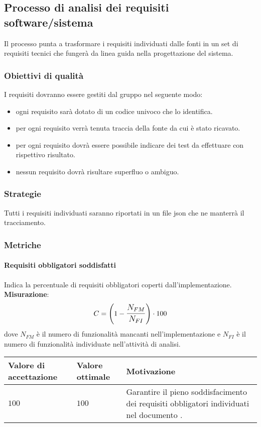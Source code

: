 \subsection{Processo di analisi dei requisiti software/sistema}

Il processo punta a trasformare i requisiti individuati dalle fonti in un set di requisiti tecnici che fungerà da linea guida nella progettazione del sistema.

\subsubsection{Obiettivi di qualità}
I requisiti dovranno essere gestiti dal gruppo nel seguente modo:

\begin{itemize}
\item ogni requisito sarà dotato di un codice univoco che lo identifica.
\item per ogni requisito verrà tenuta traccia della fonte da cui è stato ricavato.
\item per ogni requisito dovrà essere possibile indicare dei test da effettuare con rispettivo risultato.
\item nessun requisito dovrà risultare superfluo o ambiguo.
\end{itemize}

\subsubsection{Strategie}
Tutti i requisiti individuati saranno riportati in un file json che ne manterrà il tracciamento.

\subsubsection{Metriche}
\paragraph{Requisiti obbligatori soddisfatti}
Indica la percentuale di requisiti obbligatori coperti dall'implementazione. \\
\textbf{Misurazione}: 
		$$C=\left(1-\mathlarger{\frac{N_{FM}}{N_{FI}}}\right) \cdot 100$$ 
	dove $N_{FM}$ è il numero di funzionalità mancanti nell'implementazione e $N_{FI}$ è il numero di funzionalità individuate nell'attività di analisi.
	
\begin{center}
	\begin{tabular}{|P{2.5cm}|P{2.5cm}|P{6cm}|}
		\hline
			\textbf{Valore di accettazione}	& \textbf{Valore ottimale} & \textbf{Motivazione} \\
			\hline
			$100$ & $100$ & Garantire il pieno soddisfacimento dei requisiti obbligatori individuati nel documento \AdR. \\
			\hline
			\end{tabular}
\end{center}	

